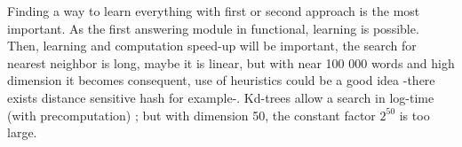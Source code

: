 Finding a way to learn everything with first or second approach is the most important. As the first answering module in functional, learning is possible. Then, learning and computation speed-up will be important, the search for nearest neighbor is long, maybe it is linear, but with near 100 000 words and high dimension it becomes consequent, use of heuristics could be a good idea -there exists distance sensitive hash for example-. Kd-trees allow a search in log-time (with precomputation) ; but with dimension 50, the constant factor $2^{50}$ is too large. 

